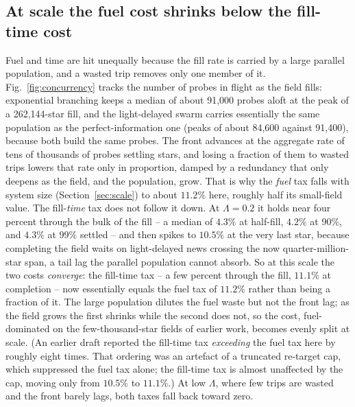 \subsection{At scale the fuel cost shrinks below the fill-time cost}
\label{sec:mechanism}
Fuel and time are hit unequally because the fill rate is carried by a large parallel population, and
a wasted trip removes only one member of it. Fig.~\ref{fig:concurrency} tracks the number of probes
in flight as the field fills: exponential branching keeps a median of about 91{,}000 probes aloft at
the peak of a 262{,}144-star fill, and the light-delayed swarm carries essentially the same population
as the perfect-information one (peaks of about 84{,}600 against 91{,}400), because both build the same
probes. The front advances at the aggregate rate of tens of thousands of probes settling stars, and
losing a fraction of them to wasted trips lowers that rate only in proportion, damped by a redundancy
that only deepens as the field, and the population, grow. That is why the \emph{fuel} tax falls with
system size (Section~\ref{sec:scale}) to about $11.2\%$ here, roughly half its
small-field value. The fill-\emph{time} tax does not follow it down. At $\Lambda = 0.2$ it holds near
four percent through the bulk of the fill -- a median of $4.3\%$ at half-fill, $4.2\%$ at 90\%, and
$4.3\%$ at 99\% settled -- and then spikes to $10.5\%$ at the very last star, because completing the
field waits on light-delayed news crossing the now quarter-million-star span, a tail lag the parallel
population cannot absorb. So at this scale the two costs \emph{converge}: the fill-time
tax -- a few percent through the fill, $11.1\%$ at completion -- now essentially equals the fuel tax
of $11.2\%$ rather than being a fraction of it. The large population dilutes the fuel waste but not
the front lag; as the field grows the first shrinks while the second does not, so the cost,
fuel-dominated on the few-thousand-star fields of earlier work, becomes evenly split at scale. (An
earlier draft reported the fill-time tax \emph{exceeding} the fuel tax here by roughly eight times.
That ordering was an artefact of a truncated re-target cap, which suppressed the fuel tax alone; the
fill-time tax is almost unaffected by the cap, moving only from $10.5\%$ to $11.1\%$.) At low $\Lambda$,
where few trips are wasted and the front barely lags, both taxes fall back toward zero.

